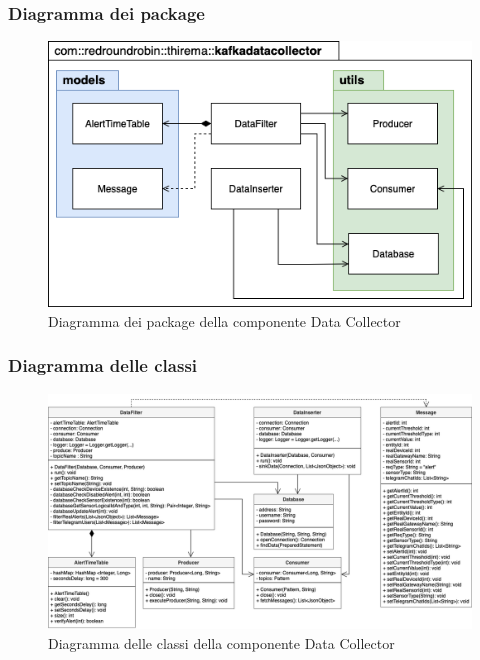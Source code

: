 	\subsubsection{Diagramma dei package}%
	\begin{figure}[H]
			\centering
			\includegraphics[scale=0.600]{res/images/DATACOLLECTOR/Packagekafkadatacollector.png}
			\caption{Diagramma dei package della componente Data Collector}
			\label{Diagramma 5}
		\end{figure}
	\begin{landscape}
	\subsubsection{Diagramma delle classi}%
		\begin{figure}[H]
			\centering
			\includegraphics[scale=0.550]{res/images/DATACOLLECTOR/ClassikafkaDataCollector.png}
			\caption{Diagramma delle classi della componente Data Collector}
			\label{Diagramma 6}
		\end{figure}
	\end{landscape}
